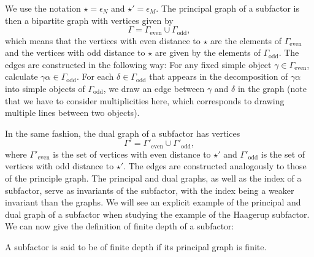 We use the notation $\star=\epsilon_N$ and $\star'=\epsilon_M$. The principal graph of a subfactor is then a bipartite graph with vertices given by 
	\begin{equation}
		\Gamma=\Gamma_\mathrm{even}\cup\Gamma_\mathrm{odd},
	\end{equation}
which means that the vertices with even distance to $\star$ are the elements of $\Gamma_\mathrm{even}$ and the vertices with odd distance to $\star$ are given by the elements of $\Gamma_\mathrm{odd}$. The edges are constructed in the following way: For any fixed simple object $\gamma\in\Gamma_\mathrm{even}$, calculate $\gamma\alpha\in\Gamma_{\mathrm{odd}}$. For each $\delta\in\Gamma_\mathrm{odd}$ that appears in the decomposition of $\gamma\alpha$ into simple objects of $\Gamma_\mathrm{odd}$, we draw an edge between $\gamma$ and $\delta$ in the graph (note that we have to consider multiplicities here, which corresponds to drawing multiple lines between two objects).

In the same fashion, the dual graph of a subfactor has vertices
	\begin{equation}
		\Gamma'=\Gamma'_\mathrm{even}\cup\Gamma'_\mathrm{odd},
	\end{equation}
where $\Gamma'_\mathrm{even}$ is the set of vertices with even distance to $\star'$ and $\Gamma'_\mathrm{odd}$ is the set of vertices with odd distance to $\star'$. The edges are constructed analogously to those of the principle graph. The principal and dual graphs, as well as the index of a subfactor, serve as invariants of the subfactor, with the index being a weaker invariant than the graphs. We will see an explicit example of the principal and dual graph of a subfactor when studying the example of the Haagerup subfactor. We can now give the definition of finite depth of a subfactor:
	
\begin{defn}
	A subfactor is said to be of finite depth if its principal graph is finite.
\end{defn}

